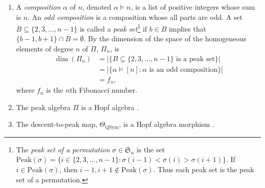 \documentclass[11pt]{amsart}
\numberwithin{equation}{section}
\newcommand{\QSym}{\mathrm{QSym}}
\newcommand{\peak}{\mathrm{Peak}}
\begin{document}
\begin{enumerate}[leftmargin=*]
\item   A \emph{composition} $\alpha$ of $n$, denoted $\alpha\vDash n$, is a list of positive integers whose sum is $n$. An  \emph{odd composition} is a composition whose all parts are odd. A set $B\subseteq \{2,3,\dots,n-1\}$ is called a \emph{peak set}\footnote{The \emph{peak set of a permutation} $\sigma\in \mathfrak{S}_n$ is the set $\peak(\sigma)=\{i\in \{2,3,\dots,n-1\}: \sigma(i-1)<\sigma(i) >\sigma(i+1)\}$. If $i\in \peak(\sigma)$, then $i-1,i+1\not\in \peak(\sigma)$. Thus each peak set is the peak set of a  permutation.} if $b\in B$ implies that $\{b-1,b+1\}\cap B=\emptyset$. By \cite[Theorem 3.1]{S97} the dimension of the space of the homogeneous elements of degree $n$ of $\Pi$, $\Pi_n$, is 
\begin{align*}
\dim(\Pi_n)&=|\{B \subseteq\{2,3,\dots,n-1\} \text{~is a peak set}\}|\\
&=|\{\alpha\vDash [n]: \text{$\alpha$ is an odd composition} \}|\\
&=f_n,
\end{align*}
where $f_n$ is the $n$th Fibonacci number. 



\item  The peak algebra $\Pi$ is a Hopf algebra \cite[Theorem 2.2]{BMSvW}. 



\item The descent-to-peak map, $\Theta_{\QSym}$, is a Hopf algebra morphism \cite[Section 2]{BMSvW}.






\end{enumerate}
\end{document}
